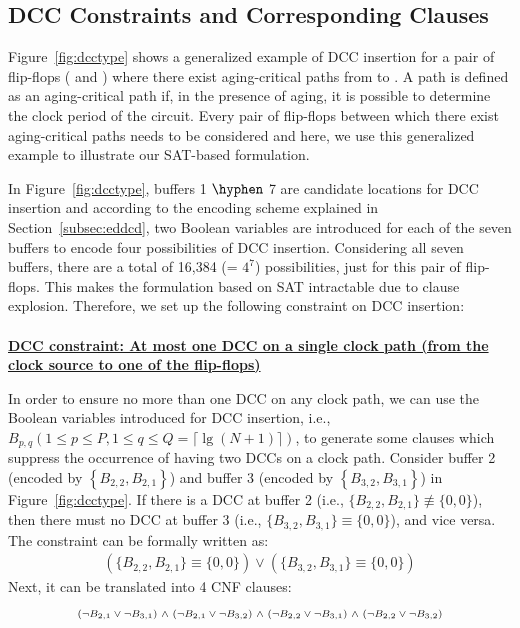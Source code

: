\subsection{DCC Constraints and Corresponding Clauses}
\label{subsec:dccccc}

Figure~\ref{fig:dcctype} shows a generalized example of DCC insertion for a pair of flip-flops ( and ) where there exist aging-critical paths from  to . A path is defined as an aging-critical path if, in the presence of aging, it is possible to determine the clock period of the circuit. Every pair of flip-flops between which there exist aging-critical paths needs to be considered and here, we use this generalized example to illustrate our SAT-based formulation.

In Figure~\ref{fig:dcctype}, buffers 1 $\hyphen$ 7 are candidate locations for DCC insertion and according to the encoding scheme explained in Section~\ref{subsec:eddcd}, two Boolean variables are introduced for each of the seven buffers to encode four possibilities of DCC insertion. Considering all seven buffers, there are a total of 16,384 (= $4^7$) possibilities, just for this pair of flip-flops. This makes the formulation based on SAT intractable due to clause explosion. Therefore, we set up the following constraint on DCC insertion: \\ \\
\textbf{\uline{DCC constraint: At most one DCC on a single clock path (from the clock source to one of the flip-flops)}}

In order to ensure no more than one DCC on any clock path, we can use the Boolean variables introduced for DCC insertion, i.e., $B_{p,q} \left(1 \leq p \leq P, 1 \leq q \leq Q = \lceil \lg (N + 1) \rceil \right)$, to generate some clauses which suppress the occurrence of having two DCCs on a clock path. Consider buffer 2 (encoded by $\left\{B_{2,2}, B_{2,1}\right\}$) and buffer 3 (encoded by $\left\{B_{3,2}, B_{3,1}\right\}$) in Figure~\ref{fig:dcctype}. If there is a DCC at buffer 2 (i.e., $\{B_{2,2}, B_{2,1}\} \not\equiv \{0, 0\}$), then there must no DCC at buffer 3 (i.e., $\{B_{3,2}, B_{3,1}\} \equiv \{0, 0\}$), and vice versa. The constraint can be formally written as:
\begin{gather*}
\left(\{B_{2,2}, B_{2,1}\} \equiv \{0, 0\}\right) \lor \left(\{B_{3,2}, B_{3,1}\} \equiv \{0, 0\}\right)
\end{gather*}
Next, it can be translated into 4 CNF clauses:
\begin{gather*}
\mbox{\fontsize{7}{8.4}\selectfont ($\neg B_{2,1}\lor\neg B_{3,1}$) $\land$ ($\neg B_{2,1}\lor\neg B_{3,2}$) $\land$ ($\neg B_{2,2}\lor\neg B_{3,1}$) $\land$ ($\neg B_{2,2}\lor\neg B_{3,2}$)} 
\end{gather*}

